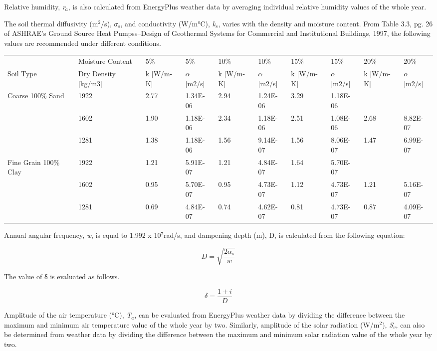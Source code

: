 Relative humidity, \emph{r\(_{a}\)}, is also calculated from EnergyPlus weather data by averaging individual relative humidity values of the whole year.

The soil thermal diffusivity (m\(^{2}\)/s), \emph{α\(_{s}\)}, and conductivity (W/m°C), \emph{k\(_{s}\)}, varies with the density and moisture content. From Table 3.3, pg. 26 of ASHRAE's Ground Source Heat Pumpss--Design of Geothermal Systems for Commercial and Institutional Buildings, 1997, the following values are recommended under different conditions.

{\scriptsize
\begin{longtable}[c]{p{0.5in}p{0.5in}p{0.5in}p{0.5in}p{0.5in}p{0.5in}p{0.5in}p{0.5in}p{0.5in}p{0.5in}}
\toprule 
 & Moisture Content & 5\% & 5\% & 10\% & 10\% & 15\% & 15\% & 20\% & 20\% \tabularnewline
Soil   Type & Dry Density  [kg/m3] & k  [W/m-K] & $\alpha$ [m2/s] & k  [W/m-K] & $\alpha$ [m2/s] & k  [W/m-K] & $\alpha$ [m2/s] & k  [W/m-K] & $\alpha$ [m2/s] \tabularnewline \midrule
\endhead
Coarse 100\%  Sand & 1922 & 2.77 & 1.34E-06 & 2.94 & 1.24E-06 & 3.29 & 1.18E-06 &  &  \tabularnewline
 & 1602 & 1.90 & 1.18E-06 & 2.34 & 1.18E-06 & 2.51 & 1.08E-06 & 2.68 & 8.82E-07 \tabularnewline
 & 1281 & 1.38 & 1.18E-06 & 1.56 & 9.14E-07 & 1.56 & 8.06E-07 & 1.47 & 6.99E-07 \tabularnewline
Fine Grain  100\% Clay & 1922 & 1.21 & 5.91E-07 & 1.21 & 4.84E-07 & 1.64 & 5.70E-07 &  &  \tabularnewline
 & 1602 & 0.95 & 5.70E-07 & 0.95 & 4.73E-07 & 1.12 & 4.73E-07 & 1.21 & 5.16E-07 \tabularnewline
 & 1281 & 0.69 & 4.84E-07 & 0.74 & 4.62E-07 & 0.81 & 4.73E-07 & 0.87 & 4.09E-07 \tabularnewline
\bottomrule
\end{longtable}}

Annual angular frequency, \emph{w}, is equal to 1.992 x 10\(^{7}\)rad/s, and dampening depth (m), D, is calculated from the following equation:

\begin{equation}
D = \sqrt {\frac{{2{\alpha_s}}}{w}}
\end{equation}

The value of δ is evaluated as follows.

\begin{equation}
\delta  = \frac{{1 + i}}{D}
\end{equation}

Amplitude of the air temperature (°C), \emph{T\(_{a}\)}, can be evaluated from EnergyPlus weather data by dividing the difference between the maximum and minimum air temperature value of the whole year by two. Similarly, amplitude of the solar radiation (W/m\(^{2}\)), \emph{S\(_{v}\)}, can also be determined from weather data by dividing the difference between the maximum and minimum solar radiation value of the whole year by two.

